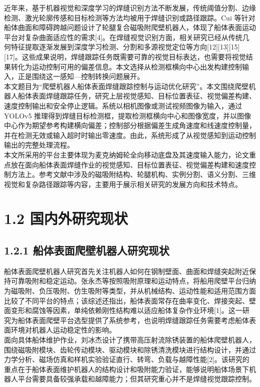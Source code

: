 \documentclass[UTF8,a4paper,12pt]{ctexrep}
\begin{document}
近年来，基于机器视觉和深度学习的焊缝识别方法不断发展，传统阈值分割、边缘检测、激光轮廓传感和目标检测等方法均被用于焊缝识别或路径跟踪。Cui 等针对船体曲面和障碍跨越问题设计了轮腿复合磁吸附爬壁机器人，体现了船体表面运动平台对复杂曲面适应性的需求[4]。在焊缝视觉识别方面，相关研究已经从传统几何特征提取逐渐发展到深度学习检测、分割和多源视觉定位等方向[12][13][15][17]。这些成果说明，焊缝跟踪任务既需要可靠的视觉目标表达，也需要将视觉结果转化为运动控制可用的偏差信息。本文选择从检测框横向中心出发构建控制输入，正是围绕这一感知—控制转换问题展开。\\

本文题目为“爬壁机器人船体表面焊缝跟踪控制与运动优化研究”。本文围绕爬壁机器人船体表面焊缝跟踪任务，研究上层视觉感知、目标位置表征、视觉偏差构建、速度控制输出和安全停止逻辑。系统以相机图像或测试视频图像为输入，通过 YOLOv5 推理得到焊缝目标检测框，提取检测框横向中心和图像宽度，并以图像中心作为期望参考构建横向偏差；控制部分根据偏差生成角速度和线速度控制量，并在检测无效或输入超时时输出零速度。由此，系统形成了从视觉感知到运动控制输出的完整处理流程。\\

本文所采用的平台主要体现为麦克纳姆轮全向移动底盘及其速度输入能力，论文重点放在面向船体表面焊缝作业的视觉感知、目标位置表征、视觉偏差构建和速度控制方法上。参考文献中涉及的磁吸附结构、轮腿机构、实例分割、语义分割、三维视觉和复杂路径跟踪等内容，主要用于展示相关研究的发展方向和技术特点。\\

\section{1.2 国内外研究现状}

\subsection{1.2.1 船体表面爬壁机器人研究现状}

船体表面爬壁机器人研究首先关注机器人如何在钢制壁面、曲面和焊缝突起附近保持可靠吸附和稳定运动。张永杰等按照吸附原理和运动特点，将船用爬壁平台归纳为磁吸附、负压吸附、仿生吸附等类型，并从机械结构、运动性能和适用范围方面比较了不同平台的特点；该综述还指出，船体表面常存在曲率变化、焊接突起、壁面变形和腐蚀等因素，单纯依赖刚性结构难以适应船体复杂作业环境[1]。这一研究为船体表面爬壁平台选型提供了系统参考，也说明焊缝跟踪任务需要考虑船体表面环境对机器人运动稳定性的影响。\\

面向具体船体维护作业，刘冰杰设计了携带高压射流除锈装置的船体爬壁机器人，围绕磁吸附模块、齿轮传动模块、驱动模块和除锈清洗模块进行结构设计，并通过力学分析、磁场仿真和样机实验验证直行、转弯、负载与越障性能[2]。该研究的重点在于船体表面维护机器人的结构设计和吸附能力验证，能够说明船体场景下机器人平台需要具备较强承载和越障能力；但其研究重心并不是焊缝视觉跟踪控制。\\
\end{document}
